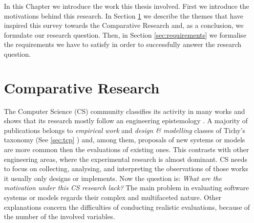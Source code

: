 In this Chapter we introduce the work this thesis involved. First we introduce the motivations behind this research. In Section \ref{sec:comparative-research} we describe the themes that have inspired this survey towards the Comparative Research and, as a conclusion, we formulate our research question. Then, in Section \ref{sec:requirements} we formalise the requirements we have to satisfy in order to successfully answer the research question.

\section{Comparative Research}\label{sec:comparative-research}
The Computer Science (CS) community classifies its activity in many works and shows that its research mostly follow an engineering epistemology \cite{Wainer:2009:EEC:1518331.1518552,Tichy:1995:EEC:209090.209093}. A majority of publications belongs to \textit{empirical work} and \textit{design \& modelling} classes of Tichy's taxonomy (See \ref{sec:tcp} ) and, among them, proposals of new systems or models  are more common then the evaluations of existing ones. This contrasts with other engineering areas, where the experimental research is almost dominant. CS needs to focus on collecting, analysing, and interpreting the observations of those works it usually only designs or implements. Now the question is: \textit{What are the motivation under this CS research lack?} The main problem in evaluating software systems or models regards their complex and multifaceted nature. Other explanations concern the difficulties of conducting realistic evaluations, because of the number of the involved variables.


